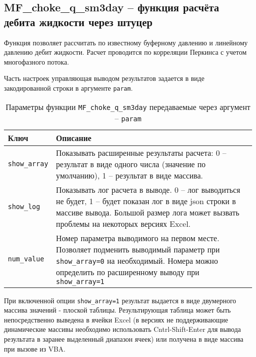 \subsection{MF\_choke\_q\_sm3day – функция расчёта дебита жидкости через штуцер}
Функция позволяет рассчитать по известному буферному давлению и линейному давлению дебит жидкости. Расчет  проводится по корреляции Перкинса \cite{Perkins_1993} с учетом многофазного потока.  


Часть настроек управляющая выводом результатов задается в виде закодированной строки в аргументе \texttt{param}.

\begin{table}[H]
	\caption{Параметры функции  \texttt{MF_choke_q_sm3day} передаваемые через аргумент -- \texttt{param}}
	\label{table:param_list}
	\begin{tabular}{p{}p{}}
		\hline
		Ключ & Описание  \\ \hline
		\texttt{show_array} & Показывать расширенные результаты расчета: 0 -- результат в виде одного числа (значение по умолчанию), 1 -- результат в виде массива.    \\ \hline
		
		\texttt{show_log} & Показывать лог расчета в выводе. 0 -- лог выводиться не будет, 1 -- будет показан лог в виде json строки в массиве вывода. Большой размер лога может вызвать проблемы на некоторых версиях Excel.   \\ \hline
		
		\texttt{num_value} & Номер параметра выводимого на первом месте. Позволяет подменить выводимый параметр при \texttt{show_array=0} на необходимый. Номера можно определить по расширенному выводу при \texttt{show_array=1}  \\ \hline
		
	\end{tabular}
\end{table}

При включенной опции \texttt{show_array=1} результат выдается в виде двумерного массива значений - плоской таблицы. Результирующая таблица может быть непосредственно выведена в ячейки Excel (в версиях не поддерживающие динамические массивы необходимо использовать Cntrl-Shift-Enter для вывода результата в заранее выделенный диапазон ячеек) или получена в виде массива при вызове из VBA.

